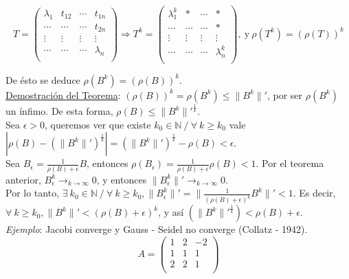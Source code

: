 $$T =
	\begin{pmatrix}
        \lambda_{1} & t_{12} & \cdots & t_{1n}\\
        \cdots & \cdots & \cdots & t_{2n}\\
        \vdots & \vdots & \vdots & \vdots\\
        \cdots & \cdots & \cdots &\lambda_{n}\\
	\end{pmatrix}
	\Rightarrow T^{k} = 
	\begin{pmatrix}
        \lambda_{1}^{k} & * & \cdots & *\\
        \cdots & \cdots & \cdots & *\\
        \vdots & \vdots & \vdots & \vdots\\
        \cdots & \cdots & \cdots &\lambda_{n}^{k}\\
	\end{pmatrix}
	,\ \text{y}\ \rho(T^{k}) = (\rho(T))^{k}
$$

De \'esto se deduce $\rho(B^{k}) = (\rho(B))^{k}$.\\

\underline{Demostraci\'on del Teorema}: $(\rho(B))^{k} = \rho(B^{k}) \leq \|B^{k}\|'$, por ser $\rho(B^{k})$ un \'infimo. De esta forma, $\rho(B)\leq \|B^{k}\|'^{\frac{1}{k}}$.\\

Sea $\epsilon > 0$, queremos ver que existe $k_{0} \in \mathbb{N}\ / \ \forall \ k \geq k_{0}$ vale $|\rho(B) - (\|B^{k}\|')^{\frac{1}{k}}| =  (\|B^{k}\|')^{\frac{1}{k}} - \rho(B) < \epsilon$.\\

Sea $B_{\epsilon} = \frac{1}{\rho(B) + \epsilon}B$, entonces $\rho(B_{\epsilon}) = \frac{1}{\rho(B) + \epsilon}\rho(B) < 1$. Por el teorema anterior, $B_{\epsilon}^{k} \rightarrow_{k \rightarrow \infty} 0$, y entonces $\|B_{\epsilon}^{k}\|' \rightarrow_{k \rightarrow \infty} 0$.\\

Por lo tanto, $\exists \ k_{0} \in \mathbb{N}\ / \ \forall \ k \geq k_{0}, \|B_{\epsilon}^{k}\|' = \|\frac{1}{(\rho(B) + \epsilon)^{k}}B^{k}\|' < 1$. Es decir, $\forall \ k \geq k_{0}, \|B^{k}\|' < (\rho(B) + \epsilon)^{k}$, y as\'i $(\|B^{k}\|'^{\frac{1}{k}}) < \rho(B) + \epsilon$.\\

\textit{Ejemplo}: Jacobi converge y Gauss - Seidel no converge (Collatz - 1942).\\

$$A =
	\begin{pmatrix}
        1 & 2 & -2\\
		1 & 1 & 1\\
		2 & 2 & 1\\        
	\end{pmatrix}
$$

